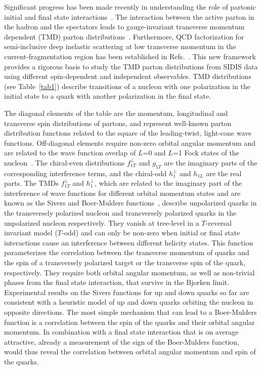 Significant progress has been made recently in understanding the role of 
partonic initial and final state interactions~\cite{Brodsky:2002cx,
Collins:2002kn,Ji:2002aa}.  The interaction between the active parton in
the hadron and the spectators leads to gauge-invariant transverse momentum 
dependent (TMD) parton distributions~\cite{Brodsky:2002cx,Collins:2002kn,
Ji:2002aa,Belitsky:2002sm,Boer:2003cm}.  Furthermore, QCD factorization for 
semi-inclusive deep inelastic scattering at low transverse momentum in the 
current-fragmentation region has been established in Refs.~\cite{Ji:2004wu,
Collins:2004nx}.  This new framework provides a rigorous basis to study the 
TMD parton distributions from SIDIS data using different spin-dependent and 
independent observables.  TMD distributions (see Table~\ref{tab1}) describe 
transitions of a nucleon with one polarization in the initial state to a 
quark with another polarization in the final state.

The diagonal elements of the table are the momentum, longitudinal and 
transverse spin distributions of partons, and represent well-known parton
distribution functions related to the square of the leading-twist, light-cone 
wave functions. Off-diagonal elements require non-zero orbital angular 
momentum and are related to the wave function overlap of $L$=0 and $L$=1 Fock 
states of the nucleon~\cite{Ji:2002xn}.  The chiral-even distributions 
$f_{1T}^\perp$ and $g_{1T}$ are the imaginary parts of the corresponding
interference terms, and the chiral-odd $h_1^\perp$ and $h_{1L}$ are the
real parts.  The TMDs $f_{1T}^\perp$ and  $h_{1}^\perp$, which are related to 
the imaginary part of the interference of wave functions for different orbital 
momentum states and are known as the Sivers and 
Boer-Mulders functions~\cite{Sivers:1990fh,Anselmino:1998yz,Brodsky:2002rv,
Collins:2002kn,Ji:2002aa,Belitsky:2002sm}, describe unpolarized quarks in the 
transversely polarized nucleon and transversely polarized quarks in the 
unpolarized nucleon respectively.  They vanish at tree-level in a $T$-reversal 
invariant model ($T$-odd) and can only be non-zero when initial or final state 
interactions cause an interference between different helicity states.  This 
function parameterizes the correlation between the transverse momentum of 
quarks and the spin of a transversely polarized target or the transverse spin 
of the quark, respectively.  They require both orbital angular momentum, as 
well as non-trivial phases from the final state interaction, that survive in 
the Bjorken limit.  Experimental results on the Sivers functions for up and 
down quarks so far are consistent with a heuristic model of up and down quarks 
orbiting  the nucleon in opposite directions.  The most simple mechanism that 
can lead to a Boer-Mulders function is a correlation between the spin of the 
quarks and their orbital angular momentum.  In combination with a final state 
interaction that is on average attractive, already a measurement of the sign 
of the Boer-Mulders function, would thus reveal the correlation between 
orbital angular momentum and spin of the quarks. 

